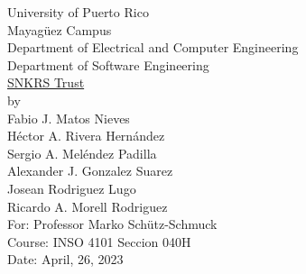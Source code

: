 \begin{titlepage}
  \begin{center}
    \large{University of Puerto Rico\\
    Mayagüez Campus\\
    \vspace{\baselineskip}
    Department of Electrical and Computer Engineering\\
    Department of Software Engineering\\}
    \vspace{5cm}
    \Huge{\underline{SNKRS Trust}\\}
    \vspace{3cm}
    \large by\\
    Fabio J. Matos Nieves\\
    Héctor A. Rivera Hernández\\
    Sergio A. Meléndez Padilla\\
    Alexander J. Gonzalez Suarez\\
    Josean Rodriguez Lugo\\
    Ricardo A. Morell Rodriguez\\
    \vspace{\baselineskip}
    For: Professor Marko Schütz-Schmuck\\
    Course: INSO 4101 Seccion 040H\\
    Date: April, 26, 2023\\
    \normalsize
  \end{center}
\end{titlepage}
